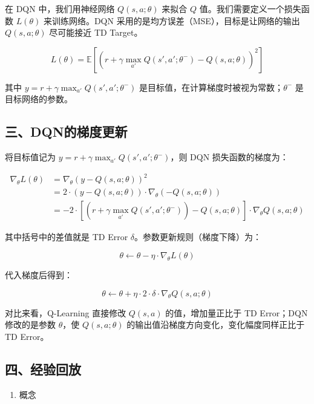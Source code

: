 在 DQN 中，我们用神经网络 \(Q(s,a;\theta)\) 来拟合 \(Q\) 值。我们需要定义一个损失函数 \(L(\theta)\) 来训练网络。DQN 采用的是均方误差（MSE），目标是让网络的输出 \(Q(s,a;\theta)\) 尽可能接近 TD Target。

\[
L(\theta)=\mathbb{E}\left[\left(r+\gamma\max_{a'}Q(s',a';\theta^-)-Q(s,a;\theta)\right)^2\right]
\]

其中 \(y=r+\gamma\max_{a'}Q(s',a';\theta^-)\) 是目标值，在计算梯度时被视为常数；\(\theta^-\) 是目标网络的参数。

\hypertarget{ux4e09dqnux7684ux68afux5ea6ux66f4ux65b0}{%
\subsection{三、DQN的梯度更新}\label{ux4e09dqnux7684ux68afux5ea6ux66f4ux65b0}}

将目标值记为 \(y=r+\gamma\max_{a'}Q(s',a';\theta^-)\)，则 DQN 损失函数的梯度为：

\[
\begin{aligned}
\nabla_\theta L(\theta)
&=\nabla_\theta\left(y-Q(s,a;\theta)\right)^2\\
&=2\cdot\left(y-Q(s,a;\theta)\right)\cdot\nabla_\theta\left(-Q(s,a;\theta)\right)\\
&=-2\cdot\left[\left(r+\gamma\max_{a'}Q(s',a';\theta^-)\right)-Q(s,a;\theta)\right]\cdot\nabla_\theta Q(s,a;\theta)
\end{aligned}
\]

其中括号中的差值就是 TD Error \(\delta\)。参数更新规则（梯度下降）为：

\[
\theta\leftarrow\theta-\eta\cdot\nabla_\theta L(\theta)
\]

代入梯度后得到：

\[
\theta\leftarrow\theta+\eta\cdot2\cdot\delta\cdot\nabla_\theta Q(s,a;\theta)
\]

对比来看，Q-Learning 直接修改 \(Q(s,a)\) 的值，增加量正比于 TD Error；DQN 修改的是参数 \(\theta\)，使 \(Q(s,a;\theta)\) 的输出值沿梯度方向变化，变化幅度同样正比于 TD Error。

\hypertarget{ux56dbux7ecfux9a8cux56deux653e}{%
\subsection{四、经验回放}\label{ux56dbux7ecfux9a8cux56deux653e}}

\begin{enumerate}
\def\labelenumi{\arabic{enumi}.}
\tightlist
\item
  概念
\end{enumerate}

